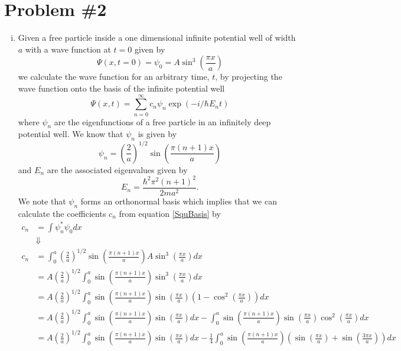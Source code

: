 \documentclass[11pt]{article}
\numberwithin{equation}{section}
\begin{document}
\pagebreak

\section{Problem \#2}
\begin{enumerate}[(i)]
\item
Given a free particle inside a one dimensional infinite potential well of width $a$ with a
wave function at $t=0$ given by
$$\Psi(x, t=0) = \psi_0 = A\sin^3\left(\frac{\pi x}{a}\right)$$
we calculate the wave function for an arbitrary time, $t$, by projecting the wave function
onto the basis of the infinite potential well
$$\Psi(x,t) = \sum_{n=0}^{\infty}c_n\psi_n\exp\left(-i/\hbar E_nt\right)$$
where $\psi_n$ are the eigenfunctions of a free particle in an infinitely deep potential 
well. We know that $\psi_n$ is given by
\begin{equation}
\psi_n = \left(\frac{2}{a}\right)^{1/2}\sin\left(\frac{\pi(n+1)x}{a}\right)
\label{SquBasis}
\end{equation}
and $E_n$ are the associated eigenvalues given by
$$E_n = \frac{\hbar^2\pi^2(n+1)^2}{2ma^2}.$$
We note that $\psi_n$ forms an orthonormal basis which implies that we can calculate the 
coefficients $c_n$ from equation \ref{SquBasis} by
\begin{align*}
c_n &= \int\psi^*_n\psi_0dx\\
&\Downarrow\\
c_n &= \int_{0}^{a}\left(\frac{2}{a}\right)^{1/2}\sin\left(\frac{\pi(n+1)x}{a}\right)A\sin^3\left(\frac{\pi x}{a}\right)dx\\
&= A\left(\frac{2}{a}\right)^{1/2}\int_{0}^{a}\sin\left(\frac{\pi(n+1)x}{a}\right)\sin^3\left(\frac{\pi x}{a}\right)dx\\
&= A\left(\frac{2}{a}\right)^{1/2}\int_{0}^{a}\sin\left(\frac{\pi(n+1)x}{a}\right)\sin\left(\frac{\pi x}{a}\right)\left(1-\cos^2\left(\frac{\pi x}{a}\right)\right)dx\\
&= A\left(\frac{2}{a}\right)^{1/2}\int_{0}^{a}\sin\left(\frac{\pi(n+1)x}{a}\right)\sin\left(\frac{\pi x}{a}\right)dx - \int_{0}^{a}\sin\left(\frac{\pi(n+1)x}{a}\right)\sin\left(\frac{\pi x}{a}\right)\cos^2\left(\frac{\pi x}{a}\right)dx\\
&= A\left(\frac{2}{a}\right)^{1/2}\int_{0}^{a}\sin\left(\frac{\pi(n+1)x}{a}\right)\sin\left(\frac{\pi x}{a}\right)dx - \frac{1}{4}\int_{0}^{a}\sin\left(\frac{\pi(n+1)x}{a}\right)\left(\sin\left(\frac{\pi x}{a}\right)+\sin\left(\frac{3\pi x}{a}\right)\right)dx\\

\end{align*}
\end{enumerate}
\end{document}
